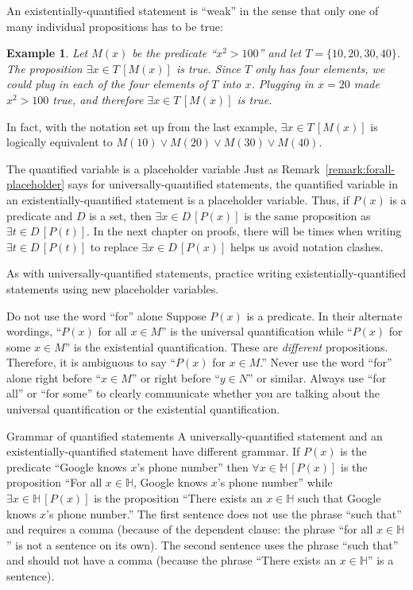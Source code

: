 \documentclass{book}
\newcounter{ekcounter}%
\theoremstyle{ekimcustom}
\newtheorem{example}[ekcounter]{Example}
\begin{document}
An existentially-quantified statement is ``weak'' in the sense that only one of many individual propositions has to be true:
\begin{example}
Let $M(x)$ be the predicate ``$x^2 > 100$'' and let $T = \{10,20,30,40\}$. The proposition $\exists x \in T\,[M(x)]$ is true. Since $T$ only has four elements, we could plug in each of the four elements of $T$ into $x$. Plugging in $x=20$ made $x^2>100$ true, and therefore $\exists x \in T\,[M(x)]$ is true.
\end{example}
In fact, with the notation set up from the last example, $\exists x \in T\,[M(x)]$ is logically equivalent to $M(10) \vee M(20) \vee M(30) \vee M(40)$.
\begin{bremark}{The quantified variable is a placeholder variable}{}
Just as Remark~\ref{remark:forall-placeholder} says for universally-quantified statements, the quantified variable in an existentially-quantified statement is a placeholder variable. Thus, if $P(x)$ is a predicate and $D$ is a set, then $\exists x \in D\,[P(x)]$ is the same proposition as $\exists t \in D\,[P(t)]$. In the next chapter on proofs, there will be times when writing $\exists t \in D\,[P(t)]$ to replace $\exists x \in D\,[P(x)]$ helps us avoid notation clashes.
\end{bremark}
As with universally-quantified statements, practice writing existentially-quantified statements using new placeholder variables.

\begin{bwarning}{Do not use the word ``for'' alone}{}
Suppose $P(x)$ is a predicate. In their alternate wordings, ``$P(x)$ for all $x \in M$'' is the universal quantification while ``$P(x)$ for some $x \in M$'' is the existential quantification. These are \emph{different} propositions. Therefore, it is ambiguous to say ``$P(x)$ for $x \in M$.'' Never use the word ``for'' alone right before ``$x \in M$'' or right before ``$y \in N$'' or similar. Always use ``for all'' or ``for some'' to clearly communicate whether you are talking about the universal quantification or the existential quantification.
\end{bwarning}

\begin{blanguage}{Grammar of quantified statements}{}
A universally-quantified statement and an existentially-quantified statement have different grammar. If $P(x)$ is the predicate ``Google knows $x$'s phone number'' then $\forall x \in \mathbb{H}\,[P(x)]$ is the proposition ``For all $x \in \mathbb{H}$, Google knows $x$'s phone number'' while $\exists x \in \mathbb{H}\,[P(x)]$ is the proposition ``There exists an $x \in \mathbb{H}$ such that Google knows $x$'s phone number.'' The first sentence does not use the phrase ``such that'' and requires a comma (because of the dependent clause: the phrase ``for all $x \in \mathbb{H}$'' is not a sentence on its own). The second sentence uses the phrase ``such that'' and should not have a comma (because the phrase ``There exists an $x \in \mathbb{H}$'' is a sentence).
\end{blanguage}
\end{document}
